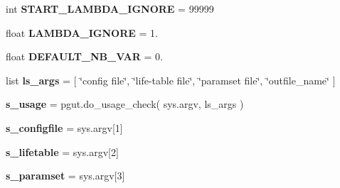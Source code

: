 \begin{DoxyCompactItemize}
\item 
int {\bfseries S\+T\+A\+R\+T\+\_\+\+L\+A\+M\+B\+D\+A\+\_\+\+I\+G\+N\+O\+RE} = 99999\hypertarget{namespacenegui_1_1pginputsimupop_aebdabae8935f1cc65cbe066536d419d1}{}\label{namespacenegui_1_1pginputsimupop_aebdabae8935f1cc65cbe066536d419d1}

\item 
float {\bfseries L\+A\+M\+B\+D\+A\+\_\+\+I\+G\+N\+O\+RE} = 1.\hypertarget{namespacenegui_1_1pginputsimupop_a96086e1c7bd6ecf9edefe0db49fc966e}{}\label{namespacenegui_1_1pginputsimupop_a96086e1c7bd6ecf9edefe0db49fc966e}

\item 
float {\bfseries D\+E\+F\+A\+U\+L\+T\+\_\+\+N\+B\+\_\+\+V\+AR} = 0.\hypertarget{namespacenegui_1_1pginputsimupop_a16c69e1c3ccf871c25423d7c2dce3dbb}{}\label{namespacenegui_1_1pginputsimupop_a16c69e1c3ccf871c25423d7c2dce3dbb}

\item 
list {\bfseries ls\+\_\+args} = \mbox{[} \char`\"{}config file\char`\"{}, \char`\"{}life-\/table file\char`\"{}, \char`\"{}paramset file\char`\"{}, \char`\"{}outfile\+\_\+name\char`\"{} \mbox{]}\hypertarget{namespacenegui_1_1pginputsimupop_a212871332a72d3f19da8448e4ca04a35}{}\label{namespacenegui_1_1pginputsimupop_a212871332a72d3f19da8448e4ca04a35}

\item 
{\bfseries s\+\_\+usage} = pgut.\+do\+\_\+usage\+\_\+check( sys.\+argv, ls\+\_\+args )\hypertarget{namespacenegui_1_1pginputsimupop_a4d7b2ce5d00d1602247ff5f3e204d434}{}\label{namespacenegui_1_1pginputsimupop_a4d7b2ce5d00d1602247ff5f3e204d434}

\item 
{\bfseries s\+\_\+configfile} = sys.\+argv\mbox{[}1\mbox{]}\hypertarget{namespacenegui_1_1pginputsimupop_af369b347e55b2a28d8cfcdec5f7cf37e}{}\label{namespacenegui_1_1pginputsimupop_af369b347e55b2a28d8cfcdec5f7cf37e}

\item 
{\bfseries s\+\_\+lifetable} = sys.\+argv\mbox{[}2\mbox{]}\hypertarget{namespacenegui_1_1pginputsimupop_a1c6ba95bf6bdd72ae956dd939192c5a3}{}\label{namespacenegui_1_1pginputsimupop_a1c6ba95bf6bdd72ae956dd939192c5a3}

\item 
{\bfseries s\+\_\+paramset} = sys.\+argv\mbox{[}3\mbox{]}\hypertarget{namespacenegui_1_1pginputsimupop_a5a79f3003860699f2ac660ae78b9efe5}{}\label{namespacenegui_1_1pginputsimupop_a5a79f3003860699f2ac660ae78b9efe5}


\end{DoxyCompactItemize}
